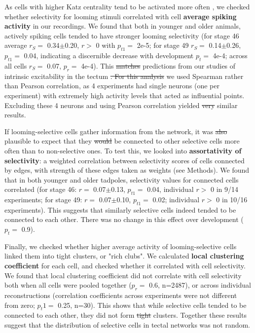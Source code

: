 \documentclass{article}
\providecommand{\DIFaddtex}[1]{{\protect\color{blue}{#1}}} %
\providecommand{\DIFdeltex}[1]{{\protect\color{red}\sout{#1}}}                      %
\providecommand{\DIFaddbegin}{} %
\providecommand{\DIFaddend}{} %
\providecommand{\DIFdelbegin}{} %
\providecommand{\DIFdelend}{} %
\providecommand{\DIFadd}[1]{\texorpdfstring{\DIFaddtex{#1}}{#1}} %
\providecommand{\DIFdel}[1]{\texorpdfstring{\DIFdeltex{#1}}{}} %
\newcommand{\DIFscaledelfig}{0.5}
\newlength{\DIFdelgraphicswidth} %
\newlength{\DIFdelgraphicsheight} %
\newcommand{\DIFaddincludegraphics}[2][]{{\color{blue}\fbox{\DIFOincludegraphics[#1]{#2}}}} %
\newcommand{\DIFdelincludegraphics}[2][]{%
\sbox{\DIFdelgraphicsbox}{\DIFOincludegraphics[#1]{#2}}%
\settoboxwidth{\DIFdelgraphicswidth}{\DIFdelgraphicsbox} %
\settoboxtotalheight{\DIFdelgraphicsheight}{\DIFdelgraphicsbox} %
\scalebox{\DIFscaledelfig}{%
\parbox[b]{\DIFdelgraphicswidth}{\usebox{\DIFdelgraphicsbox}\\[-\baselineskip] \rule{\DIFdelgraphicswidth}{0em}}\llap{\resizebox{\DIFdelgraphicswidth}{\DIFdelgraphicsheight}{%
\setlength{\unitlength}{\DIFdelgraphicswidth}%
\begin{picture}(1,1)%
\thicklines\linethickness{2pt} %
{\color[rgb]{1,0,0}\put(0,0){\framebox(1,1){}}}%
{\color[rgb]{1,0,0}\put(0,0){\line( 1,1){1}}}%
{\color[rgb]{1,0,0}\put(0,1){\line(1,-1){1}}}%
\end{picture}%
}\hspace*{3pt}}} %
} %
\DeclareRobustCommand{\DIFaddbegin}{\DIFOaddbegin \let\includegraphics\DIFaddincludegraphics} %
\DeclareRobustCommand{\DIFaddend}{\DIFOaddend \let\includegraphics\DIFOincludegraphics} %
\DeclareRobustCommand{\DIFdelbegin}{\DIFOdelbegin \let\includegraphics\DIFdelincludegraphics} %
\DeclareRobustCommand{\DIFdelend}{\DIFOaddend \let\includegraphics\DIFOincludegraphics} %
\begin{document}
As cells with higher Katz centrality tend to be activated more often \citep{fletcher2018katz}, we checked whether selectivity for looming stimuli correlated with cell \textbf{average spiking activity} in our recordings. We found that both in younger and older animals, actively spiking cells tended to have stronger looming selectivity (for stage 46 average $r_S=$ 0.34$\pm$0.20, $r>$ 0 with $p_{t1}=$ 2e-5; for stage 49 $r_S=$ 0.14$\pm$0.26, $p_{t1}=$ 0.04, indicating a discernible decrease with development $p_t=$ 4e-4; across all cells $r_S=$ 0.07, $p_r=$ 4e-4\DIFaddbegin \DIFadd{; Figure 6D}\DIFaddend ). This \DIFdelbegin \DIFdel{matches }\DIFdelend \DIFaddbegin \DIFadd{result also matches the }\DIFaddend predictions from our studies of intrinsic excitability in the tectum \citep{busch2019}\DIFdelbegin \DIFdel{. For this analysis }\DIFdelend \DIFaddbegin \DIFadd{, where we show that higher spiking cells tend to be selective for slower synaptic inputs. For the analysis above }\DIFaddend we used Spearman rather than Pearson correlation, as 4 experiments had single neurons (one per experiment) with extremely high activity levels that acted as influential points. Excluding these 4 neurons \DIFaddbegin \DIFadd{out of 2487 total }\DIFaddend and using Pearson correlation yielded \DIFdelbegin \DIFdel{very }\DIFdelend similar results.

If looming-selective cells gather information from the network, it was \DIFdelbegin \DIFdel{also }\DIFdelend plausible to expect that they \DIFdelbegin \DIFdel{would }\DIFdelend \DIFaddbegin \DIFadd{could }\DIFaddend be connected to other selective cells more often than to non-selective ones. To test this, we looked into \textbf{assortativity of selectivity}: a weighted correlation between selectivity scores of cells connected by edges, with strength of these edges taken as weights (see Methods). We found that in both younger and older tadpoles, selectivity values for connected cells correlated (for stage 46: $r=$ 0.07$\pm$0.13, $p_{t1}=$ 0.04, individual $r>$ 0 in 9/14 experiments; for stage 49: $r=$ 0.07$\pm$0.10, $p_{t1}=$ 0.02; individual $r>$ 0 in 10/16 experiments). This suggests that similarly selective cells indeed tended to be connected to each other. There was no change in this effect over development ($p_t=$ 0.9).


Finally, we checked whether higher average activity of looming-selective cells linked them into tight clusters, or "rich clubs". We calculated \textbf{local clustering coefficient} for each cell, and checked whether it correlated with cell selectivity. We found that local clustering coefficient did not correlate with cell selectivity both when all cells were pooled together ($p_r=$ 0.6, n=2487), or across individual reconstructions (correlation coefficients across experiments were not different from zero; $p_t1=$ 0.25, n=30). This shows that while selective cells tended to be connected to each other, they did not form \DIFdelbegin \DIFdel{tight }\DIFdelend clusters. Together these results suggest that the distribution of selective cells in tectal networks was not random.
\end{document}

